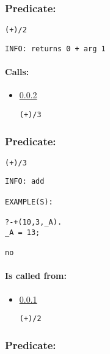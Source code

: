 \subsubsection{Predicate:} \label{V43WV95W2}

\begin{verbatim}
(+)/2
\end{verbatim}

{\small \begin{verbatim}
INFO: returns 0 + arg 1

\end{verbatim}}
\paragraph{Calls:} 
\begin{itemize}
\item \ref{V43WV95W3} 
\begin{verbatim}
(+)/3
\end{verbatim}

\end{itemize}

\subsubsection{Predicate:} \label{V43WV95W3}

\begin{verbatim}
(+)/3
\end{verbatim}

{\small \begin{verbatim}
INFO: add

EXAMPLE(S):

?-+(10,3,_A).
_A = 13;

no

\end{verbatim}}
\paragraph{Is called from:} 
\begin{itemize}
\item \ref{V43WV95W2} 
\begin{verbatim}
(+)/2
\end{verbatim}

\end{itemize}

\subsubsection{Predicate:} \label{V43WV43WV95W3}

